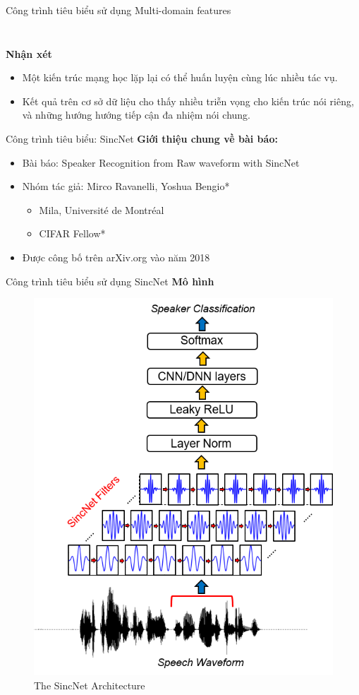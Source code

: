 \documentclass[notheorems, aspectratio=54]{beamer}
\begin{document}
\begin{frame}{Công trình tiêu biểu sử dụng Multi-domain features}
\begin{columns}
\begin{column}{0.5\textwidth}
\begin{figure}[H]
			\end{figure}
		\end{column}
	\end{columns}
	\textbf{Nhận xét}
	\begin{itemize}
		\item Một kiến trúc mạng học lặp lại có thể huấn luyện cùng lúc nhiều tác vụ.
		\item Kết quả trên cơ sở dữ liệu cho thấy nhiều triễn vọng cho kiến trúc nói riêng, và những hướng hướng tiếp cận đa nhiệm nói chung.
	\end{itemize}
\end{frame}
\begin{frame}{Công trình tiêu biểu: SincNet}
	\textbf{Giới thiệu chung về bài báo:}
	\begin{itemize}
		\item Bài báo: Speaker Recognition from Raw waveform with SincNet
		\item Nhóm tác giả: Mirco Ravanelli, Yoshua Bengio*
		\begin{itemize}
			\item Mila, Université de Montréal
			\item CIFAR Fellow*
		\end{itemize}
		\item Được công bố trên arXiv.org vào năm 2018
	\end{itemize}
\end{frame}
\begin{frame}{Công trình tiêu biểu sử dụng SincNet}
	\textbf{Mô hình}
	\begin{figure}[H]
		\includegraphics[width=0.4\linewidth]{images/SincNet.png}
		\caption{The SincNet Architecture}
		\label{fig:writing-thesis}
	\end{figure}
\end{frame}
\end{document}
